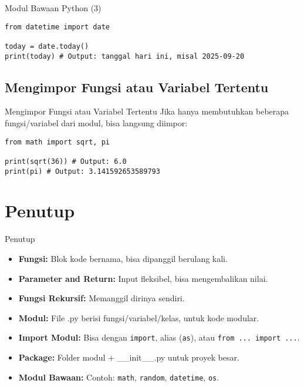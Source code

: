 \documentclass[aspectratio=169, table]{beamer}
\begin{document}
\begin{frame}[fragile]{Modul Bawaan Python (3)}
\begin{lstlisting}[style=PythonStyle, caption={Kode Python: datetime_module.py}]
from datetime import date

today = date.today()
print(today) # Output: tanggal hari ini, misal 2025-09-20
\end{lstlisting}
\end{frame}

\subsection{Mengimpor Fungsi atau Variabel Tertentu}
\begin{frame}[fragile]{Mengimpor Fungsi atau Variabel Tertentu}
Jika hanya membutuhkan beberapa fungsi/variabel dari modul, bisa langsung diimpor:

\begin{lstlisting}[style=PythonStyle]
from math import sqrt, pi

print(sqrt(36)) # Output: 6.0
print(pi) # Output: 3.141592653589793
\end{lstlisting}
\end{frame}

\section{Penutup}
\begin{frame}{Penutup}
\begin{itemize}
    \item \textbf{Fungsi:} Blok kode bernama, bisa dipanggil berulang kali.
    \item \textbf{Parameter and Return:} Input fleksibel, bisa mengembalikan nilai.
    \item \textbf{Fungsi Rekursif:} Memanggil dirinya sendiri.
    \item \textbf{Modul:} File .py berisi fungsi/variabel/kelas, untuk kode modular.
    \item \textbf{Import Modul:} Bisa dengan \texttt{import}, alias (\texttt{as}), atau \texttt{from ... import ...}.
    \item \textbf{Package:} Folder modul + \_\_init\_\_.py untuk proyek besar.
    \item \textbf{Modul Bawaan:} Contoh: \texttt{math}, \texttt{random}, \texttt{datetime}, \texttt{os}.
\end{itemize}
\end{frame}
\end{document}

